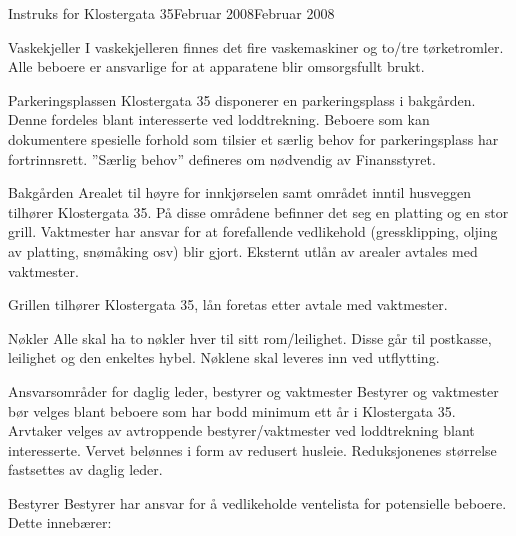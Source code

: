 \documentclass[fsbok.tex]{subfiles}
\begin{document}
\begin{instruks}{Instruks for Klostergata 35}{Februar 2008}{Februar 2008}
    \begin{instruksledd}{Vaskekjeller}
        I vaskekjelleren finnes det fire vaskemaskiner og to/tre tørketromler. Alle
        beboere er ansvarlige for at apparatene blir
        omsorgsfullt brukt.
    \end{instruksledd}

    \begin{instruksledd}{Parkeringsplassen}
        Klostergata 35 disponerer en parkeringsplass i bakgården. Denne fordeles blant
        interesserte ved loddtrekning. Beboere
        som kan dokumentere spesielle forhold som tilsier et særlig behov for
        parkeringsplass har fortrinnsrett. ”Særlig
        behov” defineres om nødvendig av Finansstyret.
    \end{instruksledd}

    \begin{instruksledd}{Bakgården}
        Arealet til høyre for innkjørselen samt området inntil husveggen tilhører
        Klostergata 35. På disse områdene befinner
        det seg en platting og en stor grill. Vaktmester har ansvar for at forefallende
        vedlikehold (gressklipping, oljing av
        platting, snømåking osv) blir gjort. Eksternt utlån av arealer avtales med
        vaktmester.

        Grillen tilhører Klostergata 35, lån foretas etter avtale med vaktmester.
    \end{instruksledd}

    \begin{instruksledd}{Nøkler}
        Alle skal ha to nøkler hver til sitt rom/leilighet. Disse går til postkasse,
        leilighet og den enkeltes hybel. Nøklene skal
        leveres inn ved utflytting.
    \end{instruksledd}

    \begin{instruksledd}{Ansvarsområder for daglig leder, bestyrer og vaktmester}
        Bestyrer og vaktmester bør velges blant beboere som har bodd minimum ett år i
        Klostergata 35. Arvtaker velges av
        avtroppende bestyrer/vaktmester ved loddtrekning blant interesserte. Vervet
        belønnes i form av redusert husleie.
        Reduksjonenes størrelse fastsettes av daglig leder.
    \end{instruksledd}

    \begin{instruksledd}{Bestyrer}
        Bestyrer har ansvar for å vedlikeholde ventelista for potensielle beboere. Dette
        innebærer:
        

\end{instruksledd}
\end{instruks}
\end{document}
